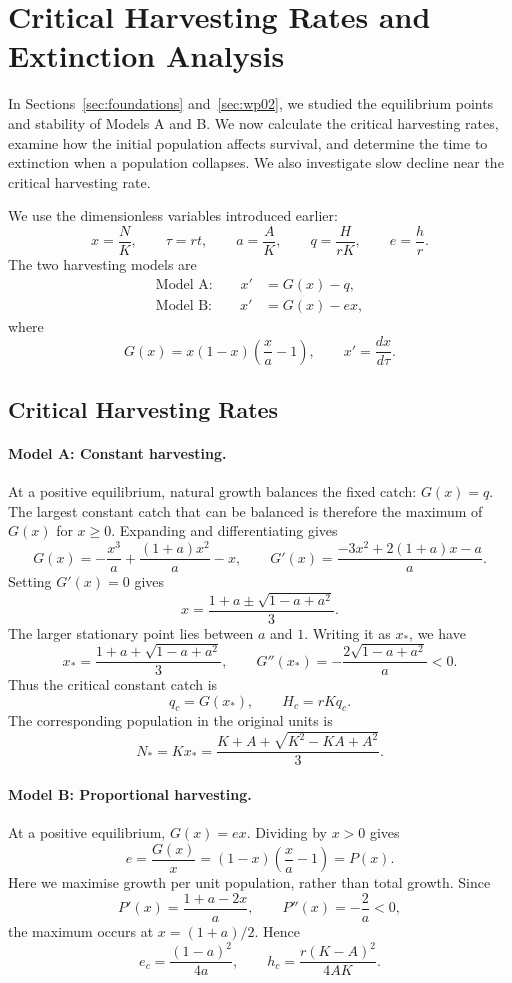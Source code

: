 
\section{Critical Harvesting Rates and Extinction Analysis}
\label{sec:wp03}

In Sections~\ref{sec:foundations} and~\ref{sec:wp02}, we studied the
equilibrium points and stability of Models A and B. We now calculate
the critical harvesting rates, examine how the initial population
affects survival, and determine the time to extinction when a
population collapses. We also investigate slow decline near the
critical harvesting rate.

We use the dimensionless variables introduced earlier:
\[
x=\frac{N}{K},\qquad
\tau=rt,\qquad
a=\frac{A}{K},\qquad
q=\frac{H}{rK},\qquad
e=\frac{h}{r}.
\]
The two harvesting models are
\begin{align}
\text{Model A:}\qquad x' &= G(x)-q,\\
\text{Model B:}\qquad x' &= G(x)-ex,
\end{align}
where
\[
G(x)=x(1-x)\left(\frac{x}{a}-1\right),
\qquad x'=\frac{dx}{d\tau}.
\]

\subsection{Critical Harvesting Rates}
\label{sec:wp03-thresholds}

\paragraph{Model A: Constant harvesting.}
At a positive equilibrium, natural growth balances the fixed
catch: $G(x)=q$. The largest constant catch that can be balanced
is therefore the maximum of $G(x)$ for $x\geq0$.
Expanding and differentiating gives
\[
G(x)=-\frac{x^3}{a}+\frac{(1+a)x^2}{a}-x,
\qquad
G'(x)=\frac{-3x^2+2(1+a)x-a}{a}.
\]
Setting $G'(x)=0$ gives
\[
x=\frac{1+a\pm\sqrt{1-a+a^2}}{3}.
\]
The larger stationary point lies between $a$ and $1$.
Writing it as $x_*$, we have
\[
x_*=\frac{1+a+\sqrt{1-a+a^2}}{3},
\qquad
G''(x_*)=-\frac{2\sqrt{1-a+a^2}}{a}<0.
\]
Thus the critical constant catch is
\begin{equation}
q_c=G(x_*),\qquad H_c=rKq_c.
\label{eq:wp03-critical-a}
\end{equation}
The corresponding population in the original units is
\[
N_*=Kx_*=
\frac{K+A+\sqrt{K^2-KA+A^2}}{3}.
\]

\paragraph{Model B: Proportional harvesting.}
At a positive equilibrium, $G(x)=ex$. Dividing by $x>0$ gives
\[
e=\frac{G(x)}{x}
=(1-x)\left(\frac{x}{a}-1\right)=P(x).
\]
Here we maximise growth per unit population, rather than
total growth. Since
\[
P'(x)=\frac{1+a-2x}{a},
\qquad P''(x)=-\frac{2}{a}<0,
\]
the maximum occurs at $x=(1+a)/2$. Hence
\begin{equation}
e_c=\frac{(1-a)^2}{4a},
\qquad
h_c=\frac{r(K-A)^2}{4AK}.
\label{eq:wp03-critical-b}
\end{equation}

